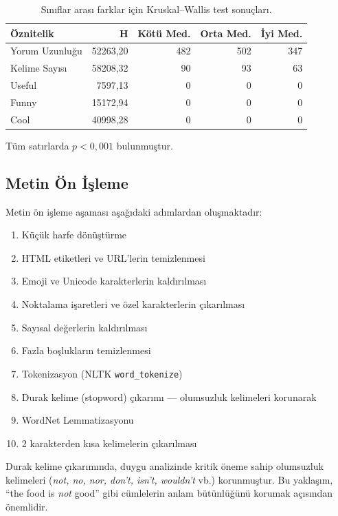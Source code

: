 \documentclass[conference]{IEEEtran}
\begin{document}
\begin{table}[htbp]
\centering
\caption{Sınıflar arası farklar için Kruskal--Wallis test sonuçları.}
\label{tab:stat_tests}
\small
\begin{tabular}{lrrrr}
\toprule
\textbf{Öznitelik} & \textbf{H} & \textbf{Kötü Med.} & \textbf{Orta Med.} & \textbf{İyi Med.} \\
\midrule
Yorum Uzunluğu & 52263,20 & 482 & 502 & 347 \\
Kelime Sayısı & 58208,32 & 90 & 93 & 63 \\
Useful & 7597,13 & 0 & 0 & 0 \\
Funny & 15172,94 & 0 & 0 & 0 \\
Cool & 40998,28 & 0 & 0 & 0 \\
\bottomrule
\end{tabular}
\vspace{2pt}
\footnotesize{Tüm satırlarda $p < 0{,}001$ bulunmuştur.}
\end{table}

\subsection{Metin Ön İşleme}

Metin ön işleme aşaması aşağıdaki adımlardan oluşmaktadır:

\begin{enumerate}
    \item Küçük harfe dönüştürme
    \item HTML etiketleri ve URL'lerin temizlenmesi
    \item Emoji ve Unicode karakterlerin kaldırılması
    \item Noktalama işaretleri ve özel karakterlerin çıkarılması
    \item Sayısal değerlerin kaldırılması
    \item Fazla boşlukların temizlenmesi
    \item Tokenizasyon (NLTK \texttt{word\_tokenize})
    \item Durak kelime (stopword) çıkarımı — olumsuzluk kelimeleri korunarak
    \item WordNet Lemmatizasyonu
    \item 2 karakterden kısa kelimelerin çıkarılması
\end{enumerate}

Durak kelime çıkarımında, duygu analizinde kritik öneme sahip olumsuzluk kelimeleri (\textit{not, no, nor, don't, isn't, wouldn't} vb.) korunmuştur. Bu yaklaşım, ``the food is \textit{not} good'' gibi cümlelerin anlam bütünlüğünü korumak açısından önemlidir.
\end{document}
